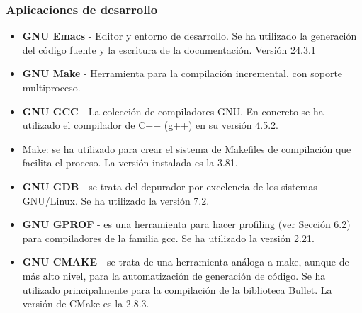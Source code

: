 \subsubsection{Aplicaciones de desarrollo}
\begin{itemize}
\item \textbf{GNU Emacs} - Editor y entorno de desarrollo. Se ha utilizado la generación del código fuente y la escritura de la documentación. Versión 24.3.1
\item \textbf{GNU Make} - Herramienta para la compilación incremental, con soporte multiproceso.
\item \textbf{GNU GCC} - La colección de compiladores GNU. En concreto se ha utilizado el compilador de C++ (g++) en su versión 4.5.2.
\item Make: se ha utilizado para crear el sistema de Makefiles de compilación que facilita el proceso. La versión instalada es la 3.81.
\item \textbf{GNU GDB} - se trata del depurador por excelencia de los sistemas GNU/Linux. Se ha utilizado la versión 7.2.
\item \textbf{GNU GPROF} - es una herramienta para hacer profiling (ver Sección 6.2) para compiladores de la familia gcc. Se ha utilizado la versión 2.21.
\item \textbf{GNU CMAKE} - se trata de una herramienta análoga a make, aunque de más alto nivel, para la automatización de generación de código. Se ha utilizado principalmente para la compilación de la biblioteca Bullet. La versión de CMake es la 2.8.3. 
\end{itemize}




